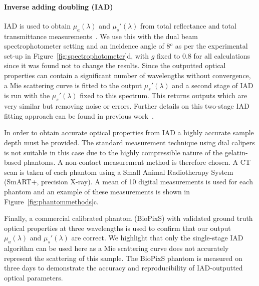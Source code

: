 \paragraph{Inverse adding doubling (IAD)}\label{sec:methodsphantommeasure2}
IAD is used to obtain $\mu_a(\lambda)$ and $\mu_s'(\lambda)$ from total reflectance and total transmittance measurements~\citep{Prahl2017}. We use this with the dual beam spectrophotometer setting and an incidence angle of 8$^o$ as per the experimental set-up in Figure~\ref{fig:spectrophotometer}d, with $g$ fixed to 0.8 for all calculations since it was found not to change the results. Since the outputted optical properties can contain a significant number of wavelengths without convergence, a Mie scattering curve is fitted to the output $\mu_s'(\lambda)$ and a second stage of IAD is run with the $\mu_s'(\lambda)$ fixed to this spectrum.
This returns outputs which are very similar but removing noise or errors.
Further details on this two-stage IAD fitting approach can be found in previous work~\citep{Xie2021}. 

In order to obtain accurate optical properties from IAD a highly accurate sample depth must be provided. 
The standard measurement technique using dial calipers is not suitable in this case due to the highly compressible nature of the gelatin-based phantoms.
A non-contact measurement method is therefore chosen. A
CT scan is taken of each phantom using a Small Animal Radiotherapy System (SmART+, precision X-ray). A mean of 10 digital measurements is used for each phantom and an example of these measurements is shown in Figure~\ref{fig:phantommethods}c.

Finally, a commercial calibrated phantom (BioPixS) with validated ground truth optical properties at three wavelengths is used to confirm that our output $\mu_a(\lambda)$ and $\mu_s'(\lambda)$ are correct. We highlight that only the single-stage IAD algorithm can be used here as a Mie scattering curve does not accurately represent the scattering of this sample. The BioPixS phantom is measured on three days to demonstrate the accuracy and reproducibility of IAD-outputted optical parameters.

